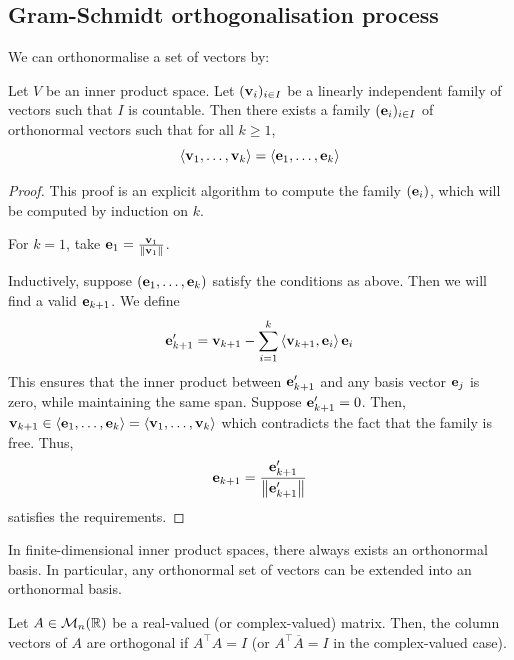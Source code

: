 \documentclass[a4paper,11pt]{article}
\begin{document}
\subsection{Gram-Schmidt orthogonalisation process}
We can orthonormalise a set of vectors by:
\begin{theorem}
	Let \( V \) be an inner product space.
	Let \( ({\bf v}_i)_{i \in I} \) be a linearly independent family of vectors such that \( I \) is countable.
	Then there exists a family \( ({\bf e}_i)_{i \in I} \) of orthonormal vectors such that for all \( k \geq 1 \),
	\[
		\left\langle{} {\bf v}_1, \dots, {\bf v}_k \right\rangle = \left\langle{} {\bf e}_1, \dots, {\bf e}_k \right\rangle
	\]
\end{theorem}
\begin{proof}
	This proof is an explicit algorithm to compute the family \( ({\bf e}_i) \), which will be computed by induction on \( k \).
	
	For \( k = 1 \), take \( {\bf e}_1 = \frac{{\bf v}_1}{\norm{{\bf v}_1}} \).

	Inductively, suppose \( ({\bf e}_1, \dots, {\bf e}_k) \) satisfy the conditions as above.
	Then we will find a valid \( {\bf e}_{k+1} \).
	We define
	\[
		{\bf e}_{k+1}' = {\bf v}_{k+1} - \sum_{i=1}^k \left\langle{{\bf v}_{k+1}, {\bf e}_i}\right\rangle {\bf e}_i
	\]
	This ensures that the inner product between \( {\bf e}_{k+1}' \) and any basis vector \( {\bf e}_j \) is zero, while maintaining the same span.
	Suppose \( {\bf e}_{k+1}' = 0 \).
	Then, \( {\bf v}_{k+1} \in \left\langle{} {\bf e}_1, \dots, {\bf e}_k \right\rangle = \left\langle{} {\bf v}_1, \dots, {\bf v}_k \right\rangle \) which contradicts the fact that the family is free.
	Thus,
	\[
		{\bf e}_{k+1} = \frac{{\bf e}_{k+1}'}{\norm{{\bf e}_{k+1}'}}
	\]
	satisfies the requirements.
\end{proof}
\begin{corollary}
	In finite-dimensional inner product spaces, there always exists an orthonormal basis.
	In particular, any orthonormal set of vectors can be extended into an orthonormal basis.
\end{corollary}
\begin{remark}
	Let \( A \in {\mathcal{M}}_n(\mathbb R) \) be a real-valued (or complex-valued) matrix.
	Then, the column vectors of \( A \) are orthogonal if \( A^\top A = I \) (or \( A^\top \overline A = I \) in the complex-valued case).
\end{remark}
\end{document}

